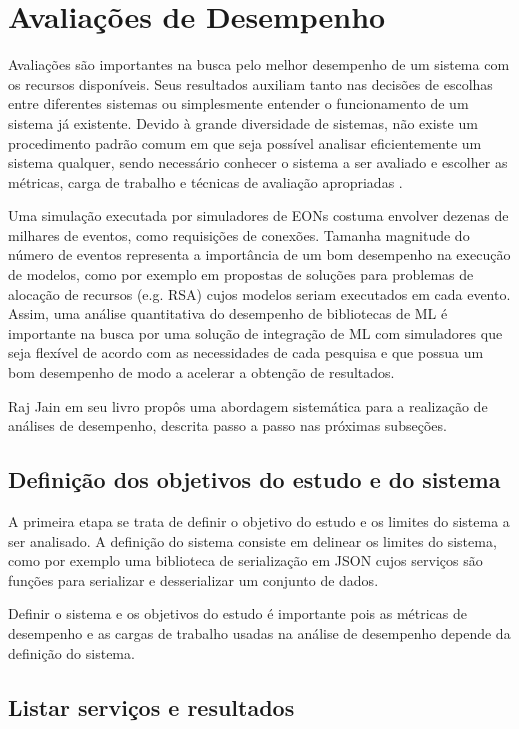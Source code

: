 \section{Avaliações de Desempenho}
\label{performance_analysis_theory}

Avaliações são importantes na busca pelo melhor desempenho de um sistema com os recursos disponíveis. Seus resultados auxiliam tanto nas decisões de escolhas entre diferentes sistemas ou simplesmente entender o funcionamento de um sistema já existente. Devido à grande diversidade de sistemas, não existe um procedimento padrão comum em que seja possível analisar eficientemente um sistema qualquer, sendo necessário conhecer o sistema a ser avaliado e escolher as métricas, carga de trabalho e técnicas de avaliação apropriadas \cite{jain1991art}.

Uma simulação executada por simuladores de EONs costuma envolver dezenas de milhares de eventos, como requisições de conexões. Tamanha magnitude do número de eventos representa a importância de um bom desempenho na execução de modelos, como por exemplo em propostas de soluções para problemas de alocação de recursos (e.g. RSA) cujos modelos seriam executados em cada evento. Assim, uma análise quantitativa do desempenho de bibliotecas de ML é importante na busca por uma solução de integração de ML com simuladores que seja flexível de acordo com as necessidades de cada pesquisa e que possua um bom desempenho de modo a acelerar a obtenção de resultados.

Raj Jain em seu livro \cite{jain1991art} propôs uma abordagem sistemática para a realização de análises de desempenho, descrita passo a passo nas próximas subseções.

\subsection{Definição dos objetivos do estudo e do sistema}

A primeira etapa se trata de definir o objetivo do estudo e os limites do sistema a ser analisado. A definição do sistema consiste em delinear os limites do sistema, como por exemplo uma biblioteca de serialização em JSON cujos serviços são funções para serializar e desserializar um conjunto de dados.

Definir o sistema e os objetivos do estudo é importante pois as métricas de desempenho e as cargas de trabalho usadas na análise de desempenho depende da definição do sistema.

\subsection{Listar serviços e resultados}


